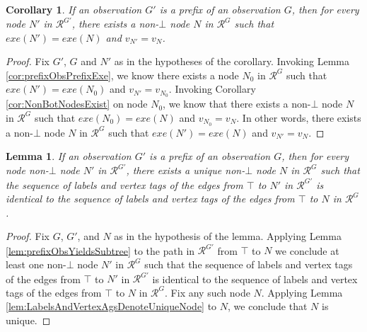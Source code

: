\documentclass[11pt]{article}
\numberwithin{theorem}{section}
\newtheorem{lemma}[theorem]{Lemma}
\newtheorem{corollary}[theorem]{Corollary}
\begin{document}
\begin{corollary}\label{cor:NonBotExistsFromPrefix}
If an observation $G'$ is a prefix of an observation $G$, then for every node $N'$ in $\mathcal{R}^{G'}$, there exists a non-$\bot$ node $N$ in $\mathcal{R}^G$ such that $exe(N') = exe(N)$ and $v_{N'} = v_{N}$.
\end{corollary}
\begin{proof}
Fix $G'$, $G$ and $N'$ as in the hypotheses of the corollary. Invoking Lemma \ref{cor:prefixObsPrefixExe}, we know there exists a node $N_0$ in $\mathcal{R}^G$ such that $exe(N') = exe(N_0)$ and $v_{N'} = v_{N_0}$. Invoking Corollary \ref{cor:NonBotNodesExist} on node $N_0$, we know that there exists a non-$\bot$ node $N$ in $\mathcal{R}^G$ such that $exe(N_0) = exe(N)$ and $v_{N_0} = v_{N}$. In other words, there exists a non-$\bot$ node $N$ in $\mathcal{R}^G$ such that $exe(N') = exe(N)$ and $v_{N'} = v_{N}$.
\end{proof}

\begin{lemma}\label{lem:UniqueNodeMappingFromPrefixObsToSuperObs}
If an observation $G'$ is a prefix of an observation $G$, then for every node non-$\bot$ node $N'$ in $\mathcal{R}^{G'}$, there exists a unique non-$\bot$ node $N$ in $\mathcal{R}^G$ such that the sequence of labels and vertex tags of the edges from $\top$ to $N'$ in $\mathcal{R}^{G'}$ is identical to the sequence of labels and vertex tags of the edges from $\top$ to $N$ in $\mathcal{R}^G$.
\end{lemma}
\begin{proof}
Fix $G$, $G'$, and $N$ as in the hypothesis of the lemma. Applying Lemma \ref{lem:prefixObsYieldsSubtree} to the path in $\mathcal{R}^{G'}$ from $\top$ to $N$ we conclude at least one non-$\bot$ node $N'$ in $\mathcal{R}^G$ such that the sequence of labels and vertex tags of the edges from $\top$ to $N'$ in $\mathcal{R}^{G'}$ is identical to the sequence of labels and vertex tags of the edges from $\top$ to $N$ in $\mathcal{R}^G$. Fix any such node $N$. Applying Lemma \ref{lem:LabelsAndVertexAgsDenoteUniqueNode} to $N$, we conclude that $N$ is unique.
\end{proof}
\end{document}
